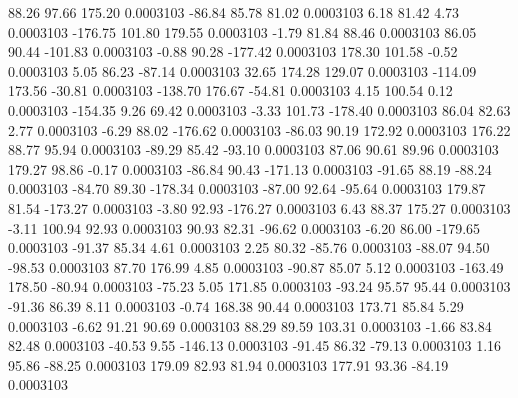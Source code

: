        88.26       97.66      175.20     0.0003103
      -86.84       85.78       81.02     0.0003103
        6.18       81.42        4.73     0.0003103
     -176.75      101.80      179.55     0.0003103
       -1.79       81.84       88.46     0.0003103
       86.05       90.44     -101.83     0.0003103
       -0.88       90.28     -177.42     0.0003103
      178.30      101.58       -0.52     0.0003103
        5.05       86.23      -87.14     0.0003103
       32.65      174.28      129.07     0.0003103
     -114.09      173.56      -30.81     0.0003103
     -138.70      176.67      -54.81     0.0003103
        4.15      100.54        0.12     0.0003103
     -154.35        9.26       69.42     0.0003103
       -3.33      101.73     -178.40     0.0003103
       86.04       82.63        2.77     0.0003103
       -6.29       88.02     -176.62     0.0003103
      -86.03       90.19      172.92     0.0003103
      176.22       88.77       95.94     0.0003103
      -89.29       85.42      -93.10     0.0003103
       87.06       90.61       89.96     0.0003103
      179.27       98.86       -0.17     0.0003103
      -86.84       90.43     -171.13     0.0003103
      -91.65       88.19      -88.24     0.0003103
      -84.70       89.30     -178.34     0.0003103
      -87.00       92.64      -95.64     0.0003103
      179.87       81.54     -173.27     0.0003103
       -3.80       92.93     -176.27     0.0003103
        6.43       88.37      175.27     0.0003103
       -3.11      100.94       92.93     0.0003103
       90.93       82.31      -96.62     0.0003103
       -6.20       86.00     -179.65     0.0003103
      -91.37       85.34        4.61     0.0003103
        2.25       80.32      -85.76     0.0003103
      -88.07       94.50      -98.53     0.0003103
       87.70      176.99        4.85     0.0003103
      -90.87       85.07        5.12     0.0003103
     -163.49      178.50      -80.94     0.0003103
      -75.23        5.05      171.85     0.0003103
      -93.24       95.57       95.44     0.0003103
      -91.36       86.39        8.11     0.0003103
       -0.74      168.38       90.44     0.0003103
      173.71       85.84        5.29     0.0003103
       -6.62       91.21       90.69     0.0003103
       88.29       89.59      103.31     0.0003103
       -1.66       83.84       82.48     0.0003103
      -40.53        9.55     -146.13     0.0003103
      -91.45       86.32      -79.13     0.0003103
        1.16       95.86      -88.25     0.0003103
      179.09       82.93       81.94     0.0003103
      177.91       93.36      -84.19     0.0003103
